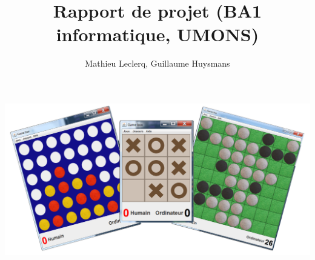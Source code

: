 \documentclass[12pt]{article}
\title{Rapport de projet (BA1 informatique, UMONS)}
\author{Mathieu Leclerq, Guillaume Huysmans}
\begin{document}
\maketitle
\includegraphics[width=\textwidth]{../cover.png}
\tableofcontents
\newpage










\appendix

\end{document}
